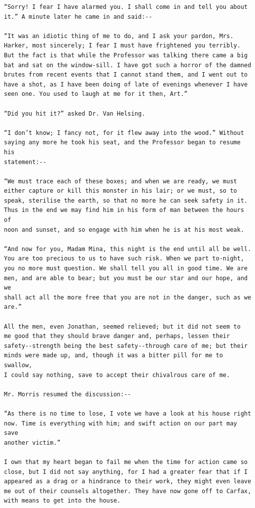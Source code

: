 \documentclass{article}
\begin{document}
\begin{verbatim}
“Sorry! I fear I have alarmed you. I shall come in and tell you about
it.” A minute later he came in and said:--

“It was an idiotic thing of me to do, and I ask your pardon, Mrs.
Harker, most sincerely; I fear I must have frightened you terribly.
But the fact is that while the Professor was talking there came a big
bat and sat on the window-sill. I have got such a horror of the damned
brutes from recent events that I cannot stand them, and I went out to
have a shot, as I have been doing of late of evenings whenever I have
seen one. You used to laugh at me for it then, Art.”

“Did you hit it?” asked Dr. Van Helsing.

“I don’t know; I fancy not, for it flew away into the wood.” Without
saying any more he took his seat, and the Professor began to resume his
statement:--

“We must trace each of these boxes; and when we are ready, we must
either capture or kill this monster in his lair; or we must, so to
speak, sterilise the earth, so that no more he can seek safety in it.
Thus in the end we may find him in his form of man between the hours of
noon and sunset, and so engage with him when he is at his most weak.

“And now for you, Madam Mina, this night is the end until all be well.
You are too precious to us to have such risk. When we part to-night,
you no more must question. We shall tell you all in good time. We are
men, and are able to bear; but you must be our star and our hope, and we
shall act all the more free that you are not in the danger, such as we
are.”

All the men, even Jonathan, seemed relieved; but it did not seem to
me good that they should brave danger and, perhaps, lessen their
safety--strength being the best safety--through care of me; but their
minds were made up, and, though it was a bitter pill for me to swallow,
I could say nothing, save to accept their chivalrous care of me.

Mr. Morris resumed the discussion:--

“As there is no time to lose, I vote we have a look at his house right
now. Time is everything with him; and swift action on our part may save
another victim.”

I own that my heart began to fail me when the time for action came so
close, but I did not say anything, for I had a greater fear that if I
appeared as a drag or a hindrance to their work, they might even leave
me out of their counsels altogether. They have now gone off to Carfax,
with means to get into the house.


\end{verbatim}
\end{document}

